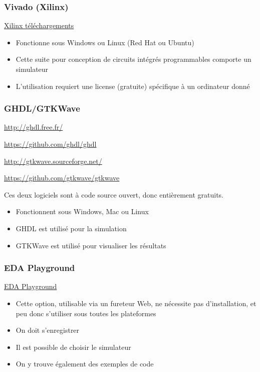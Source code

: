 \documentclass[11pt]{article}
\begin{document}
\subsubsection{Vivado (Xilinx)}
\label{sec:org3029349}

\href{https://www.xilinx.com/support/download.html}{Xilinx téléchargements}

\begin{itemize}
\item Fonctionne sous Windows ou Linux (Red Hat ou Ubuntu)
\item Cette suite pour conception de circuits intégrés programmables
comporte un simulateur
\item L'utilisation requiert une license (gratuite) spécifique à un
ordinateur donné
\end{itemize}

\subsubsection{GHDL/GTKWave}
\label{sec:org16506e9}

\url{http://ghdl.free.fr/}

\url{https://github.com/ghdl/ghdl}

\url{http://gtkwave.sourceforge.net/}

\url{https://github.com/gtkwave/gtkwave}

Ces deux logiciels sont à code source ouvert, donc entièrement
gratuits.

\begin{itemize}
\item Fonctionnent sous Windows, Mac ou Linux
\item GHDL est utilisé pour la simulation
\item GTKWave est utilisé pour visualiser les résultats
\end{itemize}

\subsubsection{EDA Playground}
\label{sec:org230b116}

\href{https://www.edaplayground.com/}{EDA Playground}

\begin{itemize}
\item Cette option, utilisable via un fureteur Web, ne nécessite pas
d'installation, et peu donc s'utiliser sous toutes les plateformes
\item On doit s'enregistrer
\item Il est possible de choisir le simulateur
\item On y trouve également des exemples de code
\end{itemize}
\end{document}
